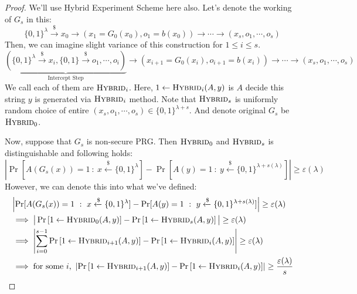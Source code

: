 \documentclass[12pt, a4paper, openany, twoside]{book}
\theoremstyle{definition}
\theoremstyle{remark}
\theoremstyle{plain}
\numberwithin{equation}{section}
\begin{document}
\begin{proof}
    
We'll use Hybrid Experiment Scheme here also. Let's denote the working of $G_s$ in this: 
\[\{0, 1\}^\lambda \xrightarrow{\$} x_0 \rightarrow (x_1 = G_0(x_0), o_1 = b(x_0)) \rightarrow \cdots \rightarrow (x_s, o_1, \cdots, o_s) \]
Then, we can imagine slight variance of this construction for $1 \leq i \leq s$.
\[\underbrace{\left(\{0, 1\}^\lambda \xrightarrow{\$} x_i, \{0, 1\} \xrightarrow{\$} o_1, \cdots, o_i\right)}_{\text{Intercept Step}} \rightarrow (x_{i+1} = G_0(x_i), o_{i+1} = b(x_i)) \rightarrow \cdots \rightarrow (x_s, o_1, \cdots, o_s)\]
We call each of them are $\textsc{Hybrid}_i$. Here, $1 \gets \textsc{Hybrid}_i(A, y)$ is $A$ decide this string $y$ is generated via $\textsc{Hybrid}_i$ method. Note that $\textsc{Hybrid}_s$ is uniformly random choice of entire $(x_s, o_1, \cdots, o_s) \in \{0, 1\}^{\lambda + s}$. 
And denote original $G_s$ be $\textsc{Hybrid}_0$. 

Now, suppose that $G_s$ is non-secure PRG. Then $\textsc{Hybrid}_0$ and $\textsc{Hybrid}_s$ is distinguishable and following holds: 
\[\left|\Pr[A(G_s(x)) = 1 ~:~ x \xleftarrow{\$} \{0, 1\}^\lambda] - \Pr[A(y) = 1 ~:~ y \xleftarrow{\$} \{0,1\}^{\lambda + s(\lambda)}]\right| \geq \varepsilon(\lambda)\]
However, we can denote this into what we've defined: 
\begin{align*}
    & \left|\Pr[A(G_s(x)) = 1 ~:~ x \xleftarrow{\$} \{0, 1\}^\lambda] - \Pr[A(y) = 1 ~:~ y \xleftarrow{\$} \{0,1\}^{\lambda + s(\lambda)}]\right| \geq \varepsilon(\lambda) \\
    & \implies \big|\Pr\left[1 \gets \textsc{Hybrid}_0(A, y)\right] - \Pr\left[1 \gets \textsc{Hybrid}_s(A, y)\right]\big| \geq \varepsilon(\lambda) \\
    & \implies \left|\sum_{i = 0}^{s-1} \Pr\left[1 \gets \textsc{Hybrid}_{i+1}(A, y)\right] - \Pr\left[1 \gets \textsc{Hybrid}_i(A, y)\right]\right| \geq \varepsilon(\lambda) \\
    & \implies \text{for some $i$, } \left|\Pr\left[1 \gets \textsc{Hybrid}_{i+1}(A, y)\right] - \Pr\left[1 \gets \textsc{Hybrid}_i(A, y)\right]\right| \geq \frac{\varepsilon(\lambda)}{s}
\end{align*}


\end{proof}
\end{document}
